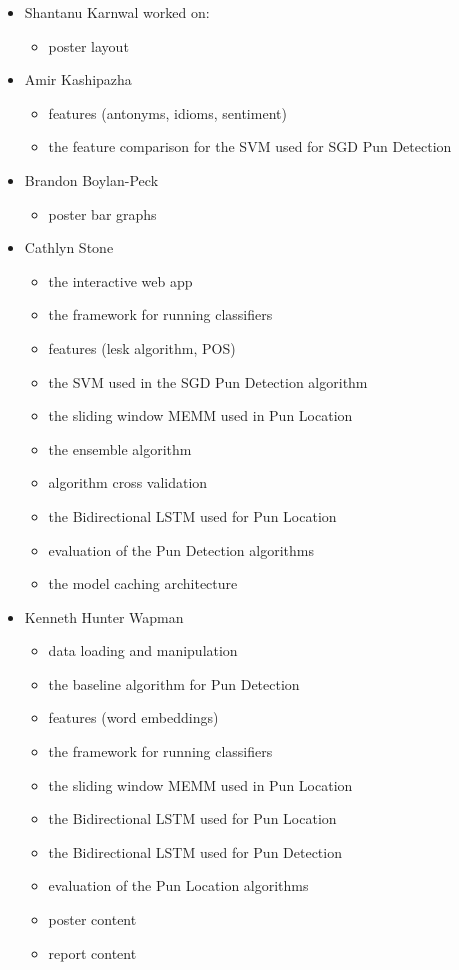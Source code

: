 \documentclass{article}
\begin{document}
\begin{itemize}

\item Shantanu Karnwal worked on:
	\begin{itemize}
		\item poster layout
	\end{itemize}
\item Amir Kashipazha
	\begin{itemize}
		\item features (antonyms, idioms, sentiment)
		\item the feature comparison for the SVM used for SGD Pun Detection
	\end{itemize}
\item Brandon Boylan-Peck
	\begin{itemize}
		\item poster bar graphs
	\end{itemize}
\item Cathlyn Stone
	\begin{itemize}
		\item the interactive web app
		\item the framework for running classifiers
		\item features (lesk algorithm, POS)
		\item the SVM used in the SGD Pun Detection algorithm
		\item the sliding window MEMM used in Pun Location
		\item the ensemble algorithm
		\item algorithm cross validation
		\item the Bidirectional LSTM used for Pun Location
		\item evaluation of the Pun Detection algorithms
		\item the model caching architecture
	\end{itemize}
\item Kenneth Hunter Wapman
	\begin{itemize}
		\item data loading and manipulation
		\item the baseline algorithm for Pun Detection
		\item features (word embeddings)
		\item the framework for running classifiers
		\item the sliding window MEMM used in Pun Location
		\item the Bidirectional LSTM used for Pun Location
		\item the Bidirectional LSTM used for Pun Detection
		\item evaluation of the Pun Location algorithms
		\item poster content
		\item report content
	\end{itemize}
\end{itemize}
\end{document}
